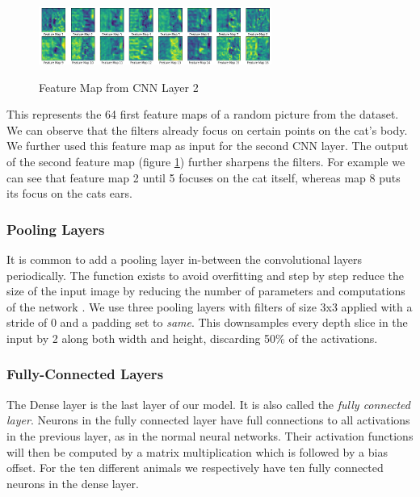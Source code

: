 \documentclass[journal]{IEEEtran}
\begin{document}
\begin{figure}
  \begin{center}
  \includegraphics[width=3in]{photo/feature_map2.png}\\
  \caption{Feature Map from CNN Layer 2}\label{featuremap2}
  \end{center}
\end{figure}

This represents the 64 first feature maps of a random picture from the dataset. We can observe that the filters already focus on certain points on the cat's body. We further used this feature map as input for the second CNN layer. The output of the second feature map (figure \ref{featuremap2}) further sharpens the filters. For example we can see that feature map 2 until 5 focuses on the cat itself, whereas map 8 puts its focus on the cats ears. \\

\subsubsection{Pooling Layers}
\noindent It is common to add a pooling layer in-between the convolutional layers periodically. The function exists to avoid overfitting and step by step reduce the size of the input image by reducing the number of parameters and computations of the network \cite{RN2}. We use three pooling layers with filters of size 3x3 applied with a stride of 0 and a padding set to \textit{same}. This downsamples every depth slice in the input by 2 along both width and height, discarding 50\% of the activations. \\
\subsubsection{Fully-Connected Layers}
\noindent The Dense layer is the last layer of our model. It is also called the \textit{fully connected layer}. Neurons in the fully connected layer have full connections to all activations in the previous layer, as in the normal neural networks. Their activation functions will then be computed by a matrix multiplication which is followed by a bias offset. 
For the ten different animals we respectively have ten fully connected neurons in the dense layer. \\
\end{document}
